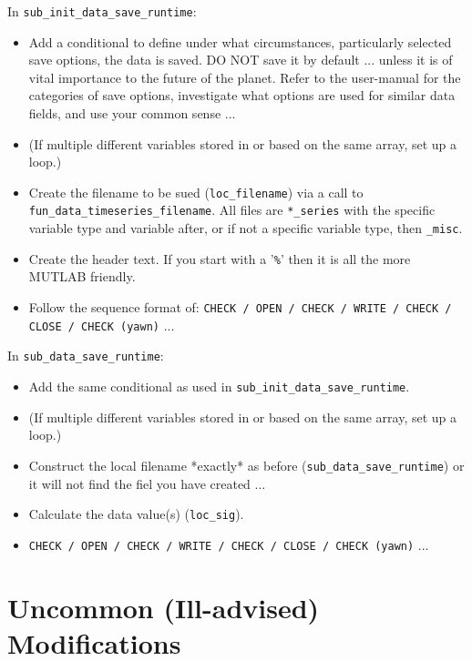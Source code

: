 \documentclass[11pt,fleqn]{book} %
\begin{document}
\noindent In \texttt{sub\_init\_data\_save\_runtime}:
\begin{itemize}[noitemsep]
\item Add a conditional to define under what circumstances, particularly selected save options, the data is saved. DO NOT save it by default ... unless it is of vital importance to the future of the planet. Refer to the user-manual for the categories of save options, investigate what options are used for similar data fields, and use your common sense ...
\item (If multiple different variables stored in or based on the same array, set up a loop.) 
\item Create the filename to be sued (\texttt{loc\_filename}) via a call to \texttt{fun\_data\_timeseries\_filename}. All files are \texttt{*\_series} with the specific variable type and variable after, or if not a specific variable type, then \texttt{\_misc}.
\item Create the header text. If you start with a '\texttt{\%}' then it is all the more MUTLAB friendly.
\item Follow the sequence format of: \texttt{CHECK / OPEN / CHECK / WRITE / CHECK / CLOSE / CHECK (yawn)} ...
\end{itemize}
\noindent In  \texttt{sub\_data\_save\_runtime}:
\begin{itemize}[noitemsep]
\item Add the same conditional as used in \texttt{sub\_init\_data\_save\_runtime}. \item (If multiple different variables stored in or based on the same array, set up a loop.) 
\item Construct the local filename *exactly* as before (\texttt{sub\_data\_save\_runtime}) or it will not find the fiel you have created ...
\item Calculate the data value(s) (\texttt{loc\_sig}).
\item  \texttt{CHECK / OPEN / CHECK / WRITE / CHECK / CLOSE / CHECK (yawn)} ...
\end{itemize}


\newpage

%
\section{Uncommon (Ill-advised) Modifications}
\end{document}
